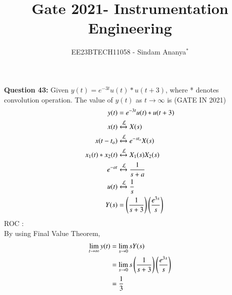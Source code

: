 \documentclass[journal,12pt,twocolumn]{IEEEtran}
\theoremstyle{remark}
\begin{document}

\vspace{3cm}

\title{Gate 2021- Instrumentation Engineering}
\author{EE23BTECH11058 - Sindam Ananya$^{*}$%
}
\maketitle
\newpage
\bigskip

\renewcommand{\thefigure}{\theenumi}
\renewcommand{\thetable}{\theenumi}

\vspace{3cm}
\textbf{Question 43:} 
Given $y(t) = e^{-3t}u(t) * u(t+3)$, where * denotes convolution operation. The value of $y(t)$ as $t \rightarrow \infty$ is
\hfill{(GATE IN 2021)}\\
\solution
\begin{align}
y(t) &=  e^{-3t}u(t) * u(t+3)\\
x(t) &\xleftrightarrow{\mathcal{L}} X(s)\\
x(t-t_o) &\xleftrightarrow{\mathcal{L}} e^{-s t_o}X(s)\\
x_1(t) * x_2(t) &\xleftrightarrow{\mathcal{L}} X_1(s)X_2(s)\\
e^{-at} &\xleftrightarrow{\mathcal{L}} \frac{1}{s + a}\\
u(t) &\xleftrightarrow{\mathcal{L}} \frac{1}{s}\\ 
Y(s) &= \left(\frac{1}{s + 3}\right)\left(\frac{e^{3s}}{s}\right)
\end{align}
ROC : \\
By using Final Value Theorem,
\begin{align}
\lim\limits_{t \to \infty} y(t) &= \lim\limits_{s \to 0} sY(s)\\
                                &= \lim\limits_{s \to 0} s\left(\frac{1}{s + 3}\right)\left(\frac{e^{3s}}{s}\right)\\
                                &= \frac{1}{3}
\end{align}
\end{document}
